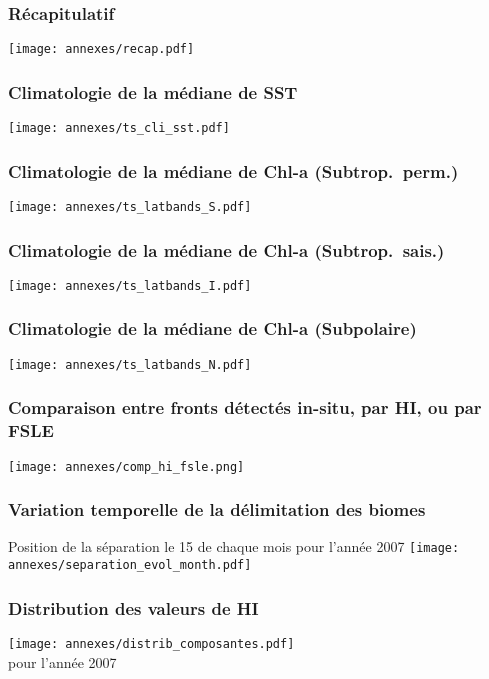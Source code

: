 \documentclass[11pt, french, aspectratio=32]{beamer}
\begin{document}
\appendix

\begin{frame}[plain]
\end{frame}

\begin{frame}
  \frametitle{Récapitulatif}
  \texttt{[image: annexes/recap.pdf]}
\end{frame}

\begin{frame}
  \frametitle{Climatologie de la médiane de SST}
  \texttt{[image: annexes/ts\_cli\_sst.pdf]}
\end{frame}

\begin{frame}
  \frametitle{Climatologie de la médiane de Chl-a (Subtrop.\ perm.)}
  \texttt{[image: annexes/ts\_latbands\_S.pdf]}
\end{frame}
\begin{frame}
  \frametitle{Climatologie de la médiane de Chl-a (Subtrop.\ sais.)}
  \texttt{[image: annexes/ts\_latbands\_I.pdf]}
\end{frame}
\begin{frame}
  \frametitle{Climatologie de la médiane de Chl-a (Subpolaire)}
  \texttt{[image: annexes/ts\_latbands\_N.pdf]}
\end{frame}

\begin{frame}
  \frametitle{Comparaison entre fronts détectés in-situ, par HI, ou par FSLE}
  \texttt{[image: annexes/comp\_hi\_fsle.png]}
\end{frame}

\begin{frame}
  \frametitle{Variation temporelle de la délimitation des biomes}
  Position de la séparation le 15 de chaque mois pour l'année 2007
  \texttt{[image: annexes/separation\_evol\_month.pdf]}
\end{frame}

\begin{frame}
  \frametitle{Distribution des valeurs de HI}
  \texttt{[image: annexes/distrib\_composantes.pdf]}
  \\
  pour l'année 2007
\end{frame}
\end{document}
